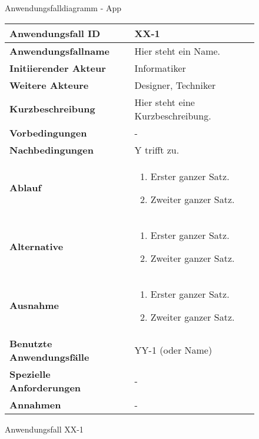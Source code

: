 \begin{figure}[h]
	\centering
	\caption{Anwendungsfalldiagramm - App}
	\label{fig:anwendungsfalldiagramm-app}
\end{figure}

\newpage

\begin{figure}[h]
	\centering
	\begin{tabularx}{\textwidth}{ X | X }
		\textbf{Anwendungsfall ID} & XX-1 \\ \hline
		\textbf{Anwendungsfallname} & Hier steht ein Name. \\ \hline
		\textbf{Initiierender Akteur} & Informatiker \\ \hline
		\textbf{Weitere Akteure} & Designer, Techniker  \\ \hline
		\textbf{Kurzbeschreibung} & Hier steht eine Kurzbeschreibung.  \\ \hline
		\textbf{Vorbedingungen} & -  \\ \hline
		\textbf{Nachbedingungen} & Y trifft zu.  \\ \hline
		\textbf{Ablauf} &
			\begin{enumerate}
				\item Erster ganzer Satz.
				\item Zweiter ganzer Satz.
			\end{enumerate} \\ \hline
		\textbf{Alternative} &
				\begin{enumerate}
					\item Erster ganzer Satz.
					\item Zweiter ganzer Satz.
				\end{enumerate}  \\ \hline
		\textbf{Ausnahme} &
				\begin{enumerate}
					\item Erster ganzer Satz.
					\item Zweiter ganzer Satz.
				\end{enumerate}  \\ \hline
		\textbf{Benutzte Anwendungsfälle} & YY-1 (oder Name) \\ \hline
		\textbf{Spezielle Anforderungen} & - \\ \hline
		\textbf{Annahmen} & -
	\end{tabularx}
	\caption{Anwendungsfall XX-1}
	\label{fig:anwendungsfall-app-tabelle-xx-1}
\end{figure}

